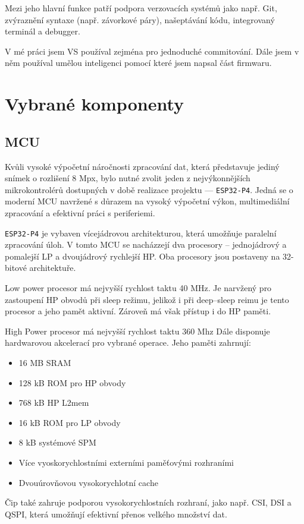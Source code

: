 \documentclass[12pt, a4paper, oneside]{report}
\begin{document}
Mezi jeho hlavní funkce patří podpora verzovacích systémů jako např. Git, zvýraznění syntaxe (např. závorkové páry), našeptávání kódu, integrovaný terminál a debugger.

V mé práci jsem VS používal zejména pro jednoduché commitování. Dále jsem v něm používal umělou inteligenci pomocí které jsem napsal část firmwaru. 
\chapter{Vybrané komponenty}
\section{MCU}
Kvůli vysoké výpočetní náročnosti zpracování dat, která představuje jediný snímek o rozlišení 8 Mpx, bylo nutné zvolit jeden z nejvýkonnějších mikrokontrolérů dostupných v době realizace projektu — \texttt{ESP32-P4}. Jedná se o moderní MCU navržené s důrazem na vysoký výpočetní výkon, multimediální zpracování a efektivní práci s periferiemi\cite{esp32p4_ds}.

\texttt{ESP32-P4} je vybaven vícejádrovou architekturou, která umožňuje paralelní zpracování úloh. V tomto MCU se nacházzejí dva procesory -- jednojádrový a pomalejší LP a dvoujádrový rychlejší HP. Oba procesory jsou postaveny na 32-bitové architektuře. 

Low power procesor má nejvyšší rychlost taktu 40 MHz. Je narvžený pro zastoupení HP obvodů při sleep režimu, jelikož i při deep--sleep reimu je tento procesor a jeho pamět aktivní. Zároveň má však přístup i do HP paměti. 

High Power procesor má nejvyšší rychlost taktu 360 Mhz Dále disponuje hardwarovou akcelerací pro vybrané operace. Jeho paměti zahrnují:
\begin{itemize}
    \item 16 MB SRAM
    \item 128 kB ROM pro HP obvody
    \item 768 kB HP L2mem
    \item 16 kB ROM pro LP obvody
    \item 8 kB systémové SPM
    \item Více vyoskorychlostními externími paměťovými rozhraními
    \item Dvouúrovňovou vysokorychlotní cache
\end{itemize} 

Čip také zahruje podporou vysokorychlostních rozhraní, jako např. CSI, DSI a QSPI, která umožňují efektivní přenos velkého množství dat.
\end{document}
